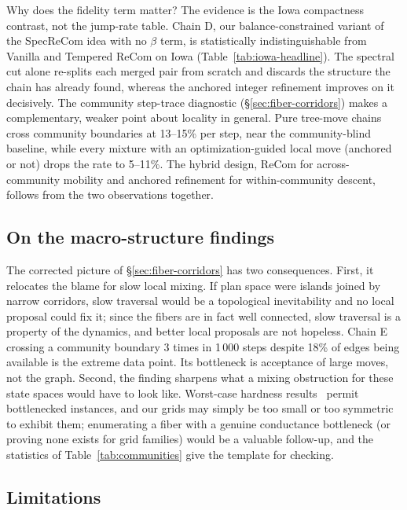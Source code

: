 \documentclass[11pt]{article}
\begin{document}
Why does the fidelity term matter? The evidence is the Iowa
compactness contrast, not the jump-rate table. Chain D, our
balance-constrained variant of the SpecReCom idea with no $\beta$
term, is statistically indistinguishable from Vanilla and Tempered
ReCom on Iowa (Table~\ref{tab:iowa-headline}). The spectral cut alone
re-splits each merged pair from scratch and discards the structure the
chain has already found, whereas the anchored integer refinement
improves on it decisively. The community step-trace diagnostic
(\S\ref{sec:fiber-corridors}) makes a complementary, weaker point
about locality in general. Pure tree-move chains cross community
boundaries at 13--15\% per step, near the community-blind baseline,
while every mixture with an optimization-guided local move (anchored
or not) drops the rate to 5--11\%. The hybrid design, ReCom for
across-community mobility and anchored refinement for
within-community descent, follows from the two observations
together.

\subsection{On the macro-structure findings}\label{sec:disc-throats}

The corrected picture of \S\ref{sec:fiber-corridors} has two
consequences. First, it relocates the blame for
slow local mixing. If plan space were islands joined by narrow
corridors, slow traversal would be a topological inevitability and no
local proposal could fix it; since the fibers are in fact well
connected, slow traversal is
a property of the dynamics, and better local proposals are not
hopeless. Chain E crossing a community boundary 3 times in 1\,000
steps despite 18\% of edges being available is the extreme data point. Its
bottleneck is acceptance of large moves, not the graph. Second, the
finding sharpens what a mixing obstruction for these state spaces
would have to look like. Worst-case hardness
results~\cite{akitaya2022reconfiguration,charikar2023complexity}
permit bottlenecked instances, and our grids may simply be too small
or too symmetric to exhibit them; enumerating a fiber with a genuine
conductance bottleneck (or proving none exists for grid families)
would be a valuable follow-up, and the statistics of
Table~\ref{tab:communities} give the template for checking.

\subsection{Limitations}\label{sec:disc-limits}
\end{document}

